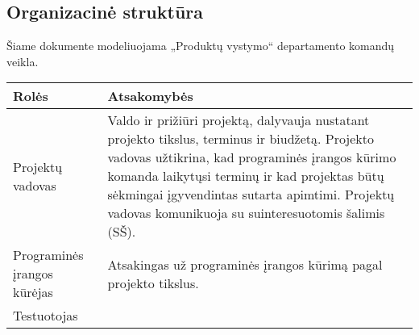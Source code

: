 \subsection{Organizacinė struktūra}
Šiame dokumente modeliuojama „Produktų vystymo“ departamento komandų veikla.
\begin{table}[h!]
\centering
\begin{tabular}{p{}|p{}}
\hline
\textbf{Rolės} & \textbf{Atsakomybės} \\ \hline



Projektų vadovas &


Valdo ir prižiūri projektą, dalyvauja nustatant projekto tikslus, terminus ir biudžetą. Projekto vadovas užtikrina, kad programinės įrangos kūrimo  komanda laikytųsi terminų ir kad projektas būtų sėkmingai įgyvendintas sutarta apimtimi. Projektų vadovas komunikuoja su suinteresuotomis šalimis (SŠ).
\\ \hline
Programinės įrangos kūrėjas &


Atsakingas už programinės įrangos kūrimą pagal projekto tikslus.
\\ \hline

Testuotojas &



\end{tabular}
\end{table}
